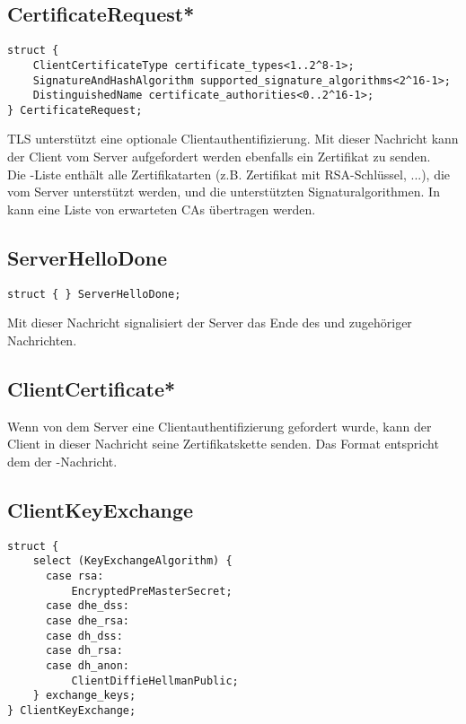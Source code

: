 \subsection{CertificateRequest*}

\begin{lstlisting}
struct {
	ClientCertificateType certificate_types<1..2^8-1>;
	SignatureAndHashAlgorithm supported_signature_algorithms<2^16-1>;
	DistinguishedName certificate_authorities<0..2^16-1>;
} CertificateRequest;
\end{lstlisting}

TLS unterstützt eine optionale Clientauthentifizierung. Mit dieser Nachricht kann der Client vom Server aufgefordert werden ebenfalls ein Zertifikat zu senden.\\
Die -Liste enthält alle Zertifikatarten (z.B. Zertifikat mit RSA-Schlüssel, ...), die vom Server unterstützt werden, und  die unterstützten Signaturalgorithmen. In  kann eine Liste von erwarteten CAs übertragen werden.

\subsection{ServerHelloDone}

\begin{lstlisting}
struct { } ServerHelloDone;
\end{lstlisting}

Mit dieser Nachricht signalisiert der Server das Ende des \serverhello{} und zugehöriger Nachrichten.

\subsection{ClientCertificate*}

Wenn von dem Server eine Clientauthentifizierung gefordert wurde, kann der Client in dieser Nachricht seine Zertifikatskette senden. Das Format entspricht dem der \servercertificate{}-Nachricht.

\subsection{ClientKeyExchange}
\label{sec_handshake_client_key_exchange}

\begin{lstlisting}
struct {
	select (KeyExchangeAlgorithm) {
	  case rsa:
	      EncryptedPreMasterSecret;
	  case dhe_dss:
	  case dhe_rsa:
	  case dh_dss:
	  case dh_rsa:
	  case dh_anon:
	      ClientDiffieHellmanPublic;
	} exchange_keys;
} ClientKeyExchange;
\end{lstlisting}

